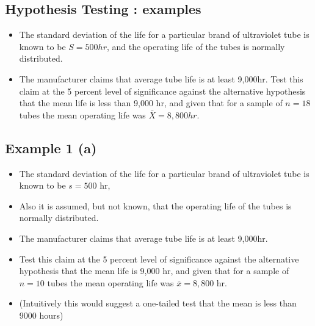 

\subsection{Hypothesis Testing : examples}

\begin{itemize}
	\item The standard deviation of the life for a particular brand of
	ultraviolet tube is known to be $S = 500 hr$, and the operating
	life of the tubes is normally distributed. 
	\item The manufacturer claims
	that average tube life is at least 9,000hr. Test this claim at the
	5 percent level of significance against the alternative hypothesis
	that the mean life is less than 9,000 hr, and given that for a
	sample of $n = 18$ tubes the mean operating life was $\bar{X}=
	8,800 hr.$
	
\end{itemize}


\begin{frame}
\subsection*{Example 1 (a)}
\large
\begin{itemize}
\item The standard deviation of the life for a particular brand of ultraviolet tube is known to be $s = 500$ hr,
\item Also it is assumed, but not known, that the operating life of the tubes is normally distributed. \item The manufacturer claims that average tube life
is at least 9,000hr. \item Test this claim at the 5 percent level of significance against the alternative hypothesis
that the mean life is 9,000 hr, and given that for a sample of $n = 10$ tubes the mean operating
life was $\bar{x} = 8,800$ hr.
\item (Intuitively this would suggest a one-tailed test that the mean is less than 9000 hours)
\end{itemize}
\end{frame}


